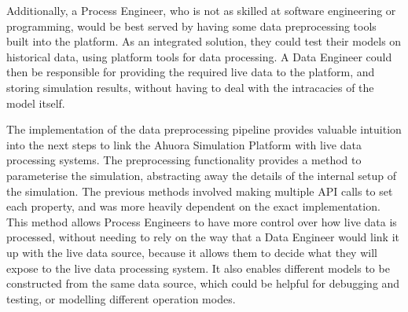Additionally, a Process Engineer, who is not as skilled at software engineering or programming, would be best served by having some data preprocessing tools built into the platform. As an integrated solution, they could test their models on historical data, using platform tools for data processing. A Data Engineer could then be responsible for providing the required live data to the platform, and storing simulation results, without having to deal with the intracacies of the model itself.


The implementation of the data preprocessing pipeline provides valuable intuition into the next steps to link the Ahuora Simulation Platform with live data processing systems. The preprocessing functionality provides a method to parameterise the simulation, abstracting away the details of the internal setup of the simulation. The previous methods involved making multiple API calls to set each property, and was more heavily dependent on the exact implementation. This method allows Process Engineers to have more control over how live data is processed, without needing to rely on the way that a Data Engineer would link it up with the live data source, because it allows them to decide what they will expose to the live data processing system. It also enables different models to be constructed from the same data source, which could be helpful for debugging and testing, or modelling different operation modes.





